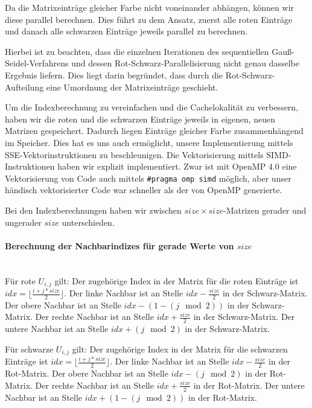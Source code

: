 \documentclass{article}
\begin{document}
Da die Matrixeinträge gleicher Farbe nicht voneinander abhängen, können wir diese parallel berechnen. Dies führt zu dem Ansatz, zuerst alle roten Einträge und danach alle schwarzen Einträge jeweils parallel zu berechnen.

Hierbei ist zu beachten, dass die einzelnen Iterationen des sequentiellen Gauß-Seidel-Verfahrens und dessen Rot-Schwarz-Parallelisierung nicht genau dasselbe Ergebnis liefern. Dies liegt darin begründet, dass durch die Rot-Schwarz-Aufteilung eine Umordnung der Matrixeinträge geschieht.

Um die Indexberechnung zu vereinfachen und die Cachelokalität zu verbessern, haben wir die roten und die schwarzen Einträge jeweils in eigenen, neuen Matrizen gespeichert. Dadurch liegen Einträge gleicher Farbe zusammenhängend im Speicher. Dies hat es uns auch ermöglicht, unsere Implementierung mittels SSE-Vektorinstruktionen zu beschleunigen. Die Vektorisierung mittels SIMD-Instruktionen haben wir explizit implementiert. Zwar ist mit OpenMP 4.0 eine Vektorisierung von Code auch mittels \texttt{\#pragma omp simd} möglich, aber unser händisch vektorisierter Code war schneller als der von OpenMP generierte.

Bei den Indexberechnungen haben wir zwischen $size \times size$-Matrizen gerader und ungerader $size$ unterschieden.

\paragraph{Berechnung der Nachbarindizes für gerade Werte von $size$}~\\
Für rote $U_{i,j}$ gilt: Der zugehörige Index in der Matrix für die roten Einträge ist $idx = \lfloor\frac{i+j*size}{2}\rfloor$. Der linke Nachbar ist an Stelle $idx - \frac{size}{2}$ in der Schwarz-Matrix. Der obere Nachbar ist an Stelle $idx - (1-(j \mod 2))$ in der Schwarz-Matrix. Der rechte Nachbar ist an Stelle $idx + \frac{size}{2}$ in der Schwarz-Matrix. Der untere Nachbar ist an Stelle $idx + (j \mod 2)$ in der Schwarz-Matrix.



Für schwarze $U_{i,j}$ gilt: Der zugehörige Index in der Matrix für die schwarzen Einträge ist $idx = \lfloor\frac{i+j*size}{2}\rfloor$. Der linke Nachbar ist an Stelle $idx - \frac{size}{2}$ in der Rot-Matrix. Der obere Nachbar ist an Stelle $idx - (j \mod 2)$ in der Rot-Matrix. Der rechte Nachbar ist an Stelle $idx + \frac{size}{2}$ in der Rot-Matrix. Der untere Nachbar ist an Stelle $idx + (1- (j \mod 2))$ in der Rot-Matrix.
\end{document}
